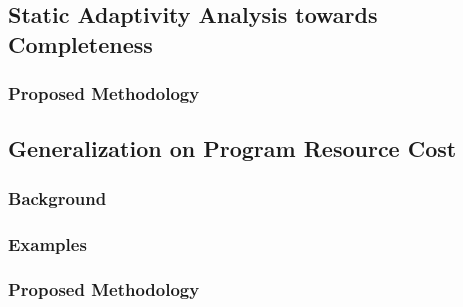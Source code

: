 \subsection{Static Adaptivity Analysis towards Completeness}
\label{subsec:furthers-adaptcomplete}

\subsubsection{Proposed Methodology}
\label{subsubsec:furthers-adaptcomplete-methodology}
%

\subsection{Generalization on Program Resource Cost}
\label{subsec:furthers-cost}

\subsubsection{Background}
\label{subsubsec:furthers-cost-backgroung}
\subsubsection{Examples}
\label{subsubsec:furthers-cost-example}

\subsubsection{Proposed Methodology}
\label{subsubsec:furthers-cost-methodology}


